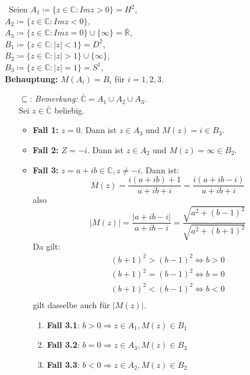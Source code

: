 \begin{solution}
 \
   Seien \( A_1 \coloneqq \{ z \in \mathbb{C}: Im z > 0 \} = H^2 \), \\
  \( A_2 \coloneqq \{ z \in \mathbb{C}: Im z < 0 \} \),\\
  \( A_3 \coloneqq \{ z \in \mathbb{C}: Im z = 0 \} \cup \{ \infty \} = \bar{\mathbb{R}} \),\\
  \( B_1 \coloneqq \{ z \in \mathbb{C} : \vert z \vert < 1\} = D^2 \), \\
  \( B_2 \coloneqq \{ z \in \mathbb{C} : \vert z \vert > 1\} \cup \{ \infty \} \),\\
  \( B_3 \coloneqq \{ z \in \mathbb{C} : \vert z \vert = 1\} = S^1 \),\\
  \textbf{Behauptung:} \( M(A_i) = B_i \) für \( i = 1, 2, 3 \).
  
  \begin{itemize}
    \item[\( \subseteq \):] \emph{Bemerkung:} \( \bar{\mathbb{C}} = A_1 \cup A_2 \cup A_3 \). \\
    Sei \( z \in \bar{\mathbb{C}} \) beliebig. \\
    \begin{itemize}
      \item \textbf{Fall 1:} \( z = 0 \). Dann ist \( z \in A_3 \) und \( M(z) = i \in B_3 \).
      \item \textbf{Fall 2:} \( Z = -i \). Dann ist \( z \in A_2 \) und \( M(z) = \infty \in B_2 \).
      \item \textbf{Fall 3:} \( z = a+ib \in \mathbb{C}, z \neq -i \). Dann ist:
      \begin{equation*}
        M(z) = \frac{i(a+ib) + 1}{a + ib + i} = \frac{i (a+ib -i)}{a + ib + i}
      \end{equation*}
      also
      \begin{equation*}
        \vert M(z) \vert = \frac{\vert a+ib-i \vert}{a+ib-i} = \frac{\sqrt{ a^2 + {(b-1)}^2}}{\sqrt{ a^2 + {(b+1)}^2}}
      \end{equation*}
      Da gilt:
      \begin{align*}
        {(b+1)}^2 > {(b-1)}^2 \Leftrightarrow b > 0 \\
        {(b+1)}^2 = {(b-1)}^2 \Leftrightarrow b = 0 \\
        {(b+1)}^2 < {(b-1)}^2 \Leftrightarrow b < 0 \\
      \end{align*}
      gilt dasselbe auch für \( \vert M(z) \vert \).
      \begin{enumerate}
        \item \textbf{Fall 3.1}: \( b > 0 \Rightarrow z \in A_1, M(z) \in B_1 \)
        \item \textbf{Fall 3.2}: \( b = 0 \Rightarrow z \in A_3, M(z) \in B_3 \) 
        \item \textbf{Fall 3.3}: \( b < 0 \Rightarrow z \in A_2, M(z) \in B_2 \) 
      \end{enumerate}
    \end{itemize}
    

\end{itemize}
\end{solution}
